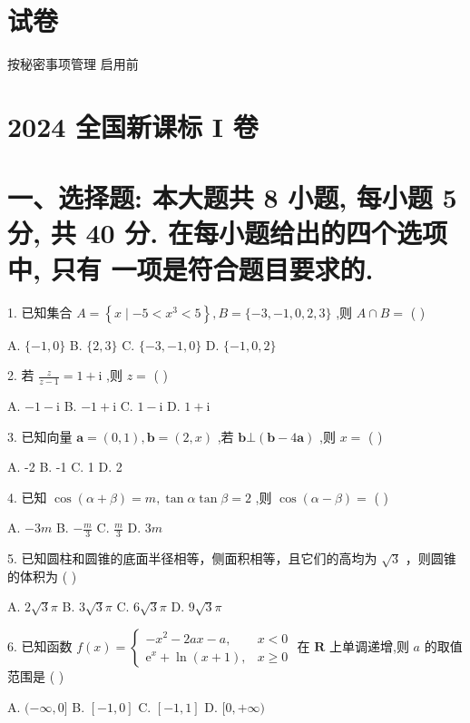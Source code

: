 \documentclass[10pt]{article}
\begin{document}
\section*{试卷}

按秘密事项管理  启用前

\section*{2024 全国新课标 I 卷}

\section*{一、选择题: 本大题共 8 小题, 每小题 5 分, 共 40 分. 在每小题给出的四个选项中, 只有 一项是符合题目要求的.}

1. 已知集合 \(A = \left\{  {x \mid   - 5 < {x}^{3} < 5}\right\}  ,B = \{  - 3, - 1,0,2,3\}\) ,则 \(A \cap  B =\) ( )

A. \(\{  - 1,0\}\) B. \(\{ 2,3\}\) C. \(\{  - 3, - 1,0\}\) D. \(\{  - 1,0,2\}\)

2. 若 \(\frac{z}{z - 1} = 1 + \mathrm{i}\) ,则 \(z =\) ( )

A. \(- 1 - \mathrm{i}\) B. \(- 1 + \mathrm{i}\) C. \(1 - \mathrm{i}\) D. \(1 + \mathrm{i}\)

3. 已知向量 \(\mathbf{a} = \left( {0,1}\right) ,\mathbf{b} = \left( {2,x}\right)\) ,若 \(\mathbf{b} \bot  \left( {\mathbf{b} - 4\mathbf{a}}\right)\) ,则 \(x =\) ( )

A. -2 B. -1 C. 1 D. 2

4. 已知 \(\cos \left( {\alpha  + \beta }\right)  = m,\tan \alpha \tan \beta  = 2\) ,则 \(\cos \left( {\alpha  - \beta }\right)  =\) ( )

A. \(- {3m}\) B. \(- \frac{m}{3}\) C. \(\frac{m}{3}\) D. \({3m}\)

5. 已知圆柱和圆锥的底面半径相等，侧面积相等，且它们的高均为 \(\sqrt{3}\) ，则圆锥的体积为 ( )

A. \(2\sqrt{3}\pi\) B. \(3\sqrt{3}\pi\) C. \(6\sqrt{3}\pi\) D. \(9\sqrt{3}\pi\)

6. 已知函数 \(f\left( x\right)  = \left\{  \begin{matrix}  - {x}^{2} - {2ax} - a, & x < 0 \\  {\mathrm{e}}^{x} + \ln \left( {x + 1}\right) , & x \geq  0 \end{matrix}\right.\) 在 \(\mathbf{R}\) 上单调递增,则 \(a\) 的取值范围是 ( )

A. \(( - \infty ,0\rbrack\) B. \(\left\lbrack  {-1,0}\right\rbrack\) C. \(\left\lbrack  {-1,1}\right\rbrack\) D. \(\lbrack 0, + \infty )\)
\end{document}
